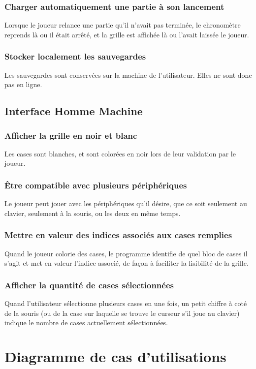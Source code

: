 \documentclass{report}
\begin{document}
		\subsubsection{Charger automatiquement une partie à son lancement}
			Lorsque le joueur relance une partie qu'il n'avait pas terminée, le chronomètre reprends là ou il était arrêté, et la grille est affichée là ou l'avait laissée le joueur.
		\subsubsection{Stocker localement les sauvegardes}
			Les sauvegardes sont conservées sur la machine de l'utilisateur. Elles ne sont donc pas en ligne.
			
	\subsection{Interface Homme Machine}
		\subsubsection{Afficher la grille en noir et blanc}
			Les cases sont blanches, et sont colorées en noir lors de leur validation par le joueur.
		\subsubsection{Être compatible avec plusieurs périphériques}
			Le joueur peut jouer avec les périphériques qu'il désire, que ce soit seulement au clavier, seulement à la souris, ou les deux en même temps.
		\subsubsection{Mettre en valeur des indices associés aux cases remplies}
			Quand le joueur colorie des cases, le programme identifie de quel bloc de cases il s'agit et met en valeur l'indice associé, de façon à faciliter la lisibilité de la grille.
		\subsubsection{Afficher la quantité de cases sélectionnées}
			Quand l'utilisateur sélectionne plusieurs cases en une fois, un petit chiffre à coté de la souris (ou de la case sur laquelle se trouve le curseur s'il joue au clavier) indique le nombre de cases actuellement sélectionnées.
		
   \section{Diagramme de cas d'utilisations}
      
\end{document}
